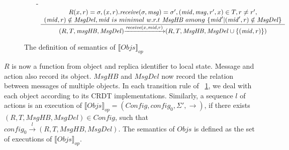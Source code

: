 \begin{figure}[ht]
\begin{itemize}
\item[-] $\begin{array}{l c}
   \bigfrac{
   \begin{array}{c}
      R(x,r) = \sigma, (x,r).\mathit{receive}(\sigma,\mathit{msg}) = \sigma', (\mathit{mid},\mathit{msg},r',x) \in T, r \neq r', \\
      (\mathit{mid},r) \notin \mathit{MsgDel}, \mathit{mid} \ is \ minimal \ w.r.t \ \mathit{MsgHB} \ among \ \{ \mathit{mid}' \vert (\mathit{mid}',r) \notin \mathit{MsgDel} \}
   \end{array}}
     {(R,T,\mathit{msgHB},\mathit{MsgDel}) {\xrightarrow{\mathit{receive}(x,\mathit{mid},r)}} (R,T,\mathit{MsgHB},\mathit{MsgDel} \cup \{ (\mathit{mid},r) \} )}
\end{array}$
\end{itemize}
\caption{The definition of semantics of $\llbracket \mathit{Objs} \rrbracket_{\mathit{op}}$}
\label{fig:the semantics of multiple operation-based CRDT object}
\end{figure}




$R$ is now a function from object and replica identifier to local state. Message and action also record its object. $\mathit{MsgHB}$ and $\mathit{MsgDel}$ now record the relation between messages of multiple objects. In each transition rule of \figurename~\ref{fig:the semantics of multiple operation-based CRDT object}, we deal with each object according to its CRDT implementations. Similarly, a sequence $l$ of actions is an execution of $\llbracket \mathit{Objs} \rrbracket_{\mathit{op}} = (\mathit{Config},\mathit{config}_0,\Sigma',\rightarrow)$, if there exists $(R,T,\mathit{MsgHB},\mathit{MsgDel}) \in \mathit{Config}$, such that $\mathit{config}_0 {\xrightarrow{ l }} (R,T,\mathit{MsgHB},\mathit{MsgDel})$. The semantics of $\mathit{Objs}$ is defined as the set of executions of $\llbracket \mathit{Objs} \rrbracket_{\mathit{op}}$.





